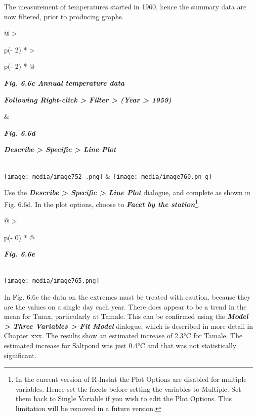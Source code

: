 \documentclass[
  letterpaper,
  DIV=11,
  numbers=noendperiod]{scrreprt}
\begin{document}
The measurement of temperatures started in 1960, hence the summary data
are now filtered, prior to producing graphs.

\begin{longtable}[]{@{}
  >{\raggedright\arraybackslash}p{(\columnwidth - 2\tabcolsep) * }
  >{\raggedright\arraybackslash}p{(\columnwidth - 2\tabcolsep) * }@{}}
\toprule\noalign{}
\begin{minipage}[b]{\linewidth}\raggedright
\textbf{\emph{Fig. 6.6c Annual temperature data}}

\textbf{\emph{Following Right-click \textgreater{} Filter \textgreater{}
(Year \textgreater{} 1959)}}
\end{minipage} & \begin{minipage}[b]{\linewidth}\raggedright
\textbf{\emph{Fig. 6.6d}}

\textbf{\emph{Describe \textgreater{} Specific \textgreater{} Line
Plot}}
\end{minipage} \\
\midrule\noalign{}
\endhead
\bottomrule\noalign{}
\endlastfoot
\texttt{[image: media/image752 .png]}
&
\texttt{[image: media/image760.pn g]} \\
\end{longtable}

Use the \textbf{\emph{Describe \textgreater{} Specific \textgreater{}
Line Plot}} dialogue, and complete as shown in Fig. 6.6d. In the plot
options, choose to \textbf{\emph{Facet by the station}}\footnote{In the
  current version of R-Instat the Plot Options are disabled for multiple
  variables. Hence set the facets before setting the variables to
  Multiple. Set them back to Single Variable if you wish to edit the
  Plot Options. This limitation will be removed in a future version.}.

\begin{longtable}[]{@{}
  >{\raggedright\arraybackslash}p{(\columnwidth - 0\tabcolsep) * }@{}}
\toprule\noalign{}
\begin{minipage}[b]{\linewidth}\raggedright
\textbf{\emph{Fig. 6.6e}}
\end{minipage} \\
\midrule\noalign{}
\endhead
\bottomrule\noalign{}
\endlastfoot
\texttt{[image: media/image765.png]} \\
\end{longtable}

In Fig. 6.6e the data on the extremes must be treated with caution,
because they are the values on a single day each year. There does appear
to be a trend in the mean for Tmax, particularly at Tamale. This can be
confirmed using the \textbf{\emph{Model \textgreater{} Three Variables
\textgreater{} Fit Model}} dialogue, which is described in more detail
in Chapter xxx. The results show an estimated increase of 2.3°C for
Tamale. The estimated increase for Saltpond was just 0.4°C and that was
not statistically significant.
\end{document}
